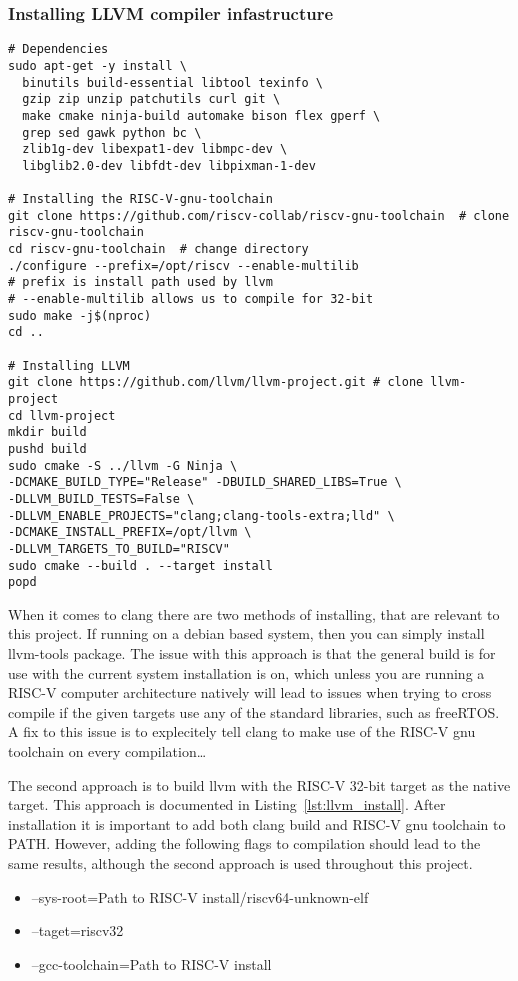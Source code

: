 \subsubsection{Installing LLVM compiler infastructure}
\begin{lstlisting}[caption=Installing LLVM compiler infastructure with RISC-V
32-bit as native target., float=*, label=lst:llvm_install]
# Dependencies
sudo apt-get -y install \
  binutils build-essential libtool texinfo \
  gzip zip unzip patchutils curl git \
  make cmake ninja-build automake bison flex gperf \
  grep sed gawk python bc \
  zlib1g-dev libexpat1-dev libmpc-dev \
  libglib2.0-dev libfdt-dev libpixman-1-dev

# Installing the RISC-V-gnu-toolchain
git clone https://github.com/riscv-collab/riscv-gnu-toolchain  # clone
riscv-gnu-toolchain
cd riscv-gnu-toolchain  # change directory
./configure --prefix=/opt/riscv --enable-multilib
# prefix is install path used by llvm
# --enable-multilib allows us to compile for 32-bit
sudo make -j$(nproc)
cd ..

# Installing LLVM
git clone https://github.com/llvm/llvm-project.git # clone llvm-project
cd llvm-project
mkdir build
pushd build
sudo cmake -S ../llvm -G Ninja \
-DCMAKE_BUILD_TYPE="Release" -DBUILD_SHARED_LIBS=True \
-DLLVM_BUILD_TESTS=False \
-DLLVM_ENABLE_PROJECTS="clang;clang-tools-extra;lld" \
-DCMAKE_INSTALL_PREFIX=/opt/llvm \
-DLLVM_TARGETS_TO_BUILD="RISCV"
sudo cmake --build . --target install
popd
\end{lstlisting}
When it comes to clang there are two methods of installing, that are relevant to
this project. If running on a debian based system, then you can simply install
llvm-tools package. The issue with this approach is that the general build is
for use with the current system installation is on, which unless you are running
a RISC-V computer architecture natively will lead to issues when trying to cross
compile if the given targets use any of the standard libraries, such as
freeRTOS. A fix to this issue is to explecitely tell clang to make use of the
RISC-V gnu toolchain on every compilation\dots

The second approach is to build llvm with the RISC-V 32-bit target as the native
target. This approach is documented in Listing~\ref{lst:llvm_install}. After
installation it is important to add both clang build and RISC-V gnu toolchain to
PATH. However, adding the following flags to compilation
should lead to the same results, although the second approach is used throughout
this project.
\begin{itemize}
  \item --sys-root={Path to RISC-V install}/riscv64-unknown-elf
  \item --taget=riscv32
  \item --gcc-toolchain={Path to RISC-V install}
\end{itemize}


